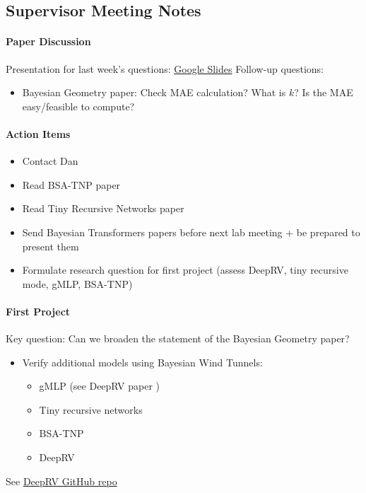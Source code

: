 \documentclass[12pt,a4paper,twoside]{article}
\begin{document}
\subsection{Supervisor Meeting Notes}
\begin{meetingsummary}
	\paragraph{Paper Discussion}
	Presentation for last week's questions: \href{https://docs.google.com/presentation/d/1HNfpfqevP0p0xPKaVW9HBpFZLispXNwz7ia5DhiXgAo}{Google Slides}
	Follow-up questions:
	\begin{itemize}
		\item Bayesian Geometry paper: Check MAE calculation? What is $k$? Is the MAE easy/feasible to compute?
	\end{itemize}
	\paragraph{Action Items}
	\begin{itemize}
		\item Contact Dan
		\item Read BSA-TNP paper~\cite{Jenson2025}
		\item Read Tiny Recursive Networks paper~\cite{JolicoeurMartineau2024}
		\item Send Bayesian Transformers papers before next lab meeting + be prepared to present them
		\item Formulate research question for first project (assess DeepRV, tiny recursive mode, gMLP, BSA-TNP)
	\end{itemize}
	\paragraph{First Project}
	Key question: Can we broaden the statement of the Bayesian Geometry paper?
	\begin{itemize}
		\item Verify additional models using Bayesian Wind Tunnels:
		\begin{itemize}
			\item gMLP (see DeepRV paper \cite{Navott2025})
			\item Tiny recursive networks~\cite{JolicoeurMartineau2024}
			\item BSA-TNP~\cite{Jenson2025}
			\item DeepRV~\cite{Navott2025}
		\end{itemize}
	\end{itemize}
	See \href{https://github.com/MLGlobalHealth/dl4bi}{DeepRV GitHub repo}

\end{meetingsummary}
\end{document}
